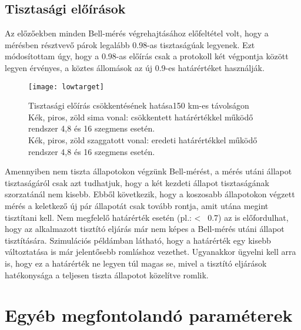 \subsection{Tisztasági előírások}
Az előzőekben minden Bell-mérés végrehajtásához előfeltétel volt, hogy a mérésben résztvevő párok legalább 0.98-as tisztaságúak legyenek. Ezt módosítottam úgy, hogy a 0.98-as előírás csak a protokoll két végpontja között legyen érvényes, a köztes állomások az új 0.9-es határértéket használják. 

\begin{figure}[H]
\centering
\texttt{[image: lowtarget]}
\caption[Határérték csökkentése]
{Tisztasági előírás csökkentésének hatása150 km-es távolságon \\
Kék, piros, zöld sima vonal: csökkentett határértékkel működő rendszer 4,8 és 16 szegmens esetén. \\
Kék, piros, zöld szaggatott vonal: eredeti határértékkel működő rendszer 4,8 és 16 szegmens esetén.
}
\end{figure}

Amennyiben nem tiszta állapotokon végzünk Bell-mérést, a mérés utáni állapot tisztaságáról csak azt tudhatjuk, hogy a két kezdeti állapot tisztaságának szorzatánál nem kisebb. Ebből következik, hogy a koszosabb állapotokon végzett mérés a keletkező új pár állapotát csak tovább rontja, amit utána megint tisztítani kell. Nem megfelelő határérték esetén (pl.: < ~0.7) az is előfordulhat, hogy az alkalmazott tisztító eljárás már nem képes a Bell-mérés utáni állapot tisztítására. Szimulációs példámban látható, hogy a határérték egy kisebb változtatása is már jelentősebb romláshoz vezethet. Ugyanakkor ügyelni kell arra is, hogy ez a határérték ne legyen túl magas se, mivel a tisztító eljárások hatékonysága a teljesen tiszta állapotot közelítve romlik.

\section{Egyéb megfontolandó paraméterek}
